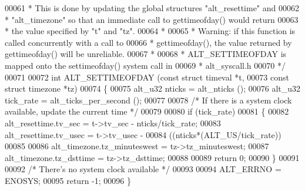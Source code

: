 \begin{DoxyCode}
00061 \textcolor{comment}{ * This is done by updating the global structures "alt\_resettime" and }
00062 \textcolor{comment}{ * "alt\_timezone" so that an immediate call to gettimeofday() would return}
00063 \textcolor{comment}{ * the value specified by "t" and "tz". }
00064 \textcolor{comment}{ *}
00065 \textcolor{comment}{ * Warning: if this function is called concurrently with a call to }
00066 \textcolor{comment}{ * gettimeofday(), the value returned by gettimeofday() will be unreliable.  }
00067 \textcolor{comment}{ *}
00068 \textcolor{comment}{ * ALT\_SETTIMEOFDAY is mapped onto the settimeofday() system call in }
00069 \textcolor{comment}{ * alt\_syscall.h}
00070 \textcolor{comment}{ */}
00071  
00072 \textcolor{keywordtype}{int} ALT_SETTIMEOFDAY (\textcolor{keyword}{const} \textcolor{keyword}{struct} timeval  *t,
00073                       \textcolor{keyword}{const} \textcolor{keyword}{struct} timezone *tz)
00074 \{
00075   alt_u32 nticks    = alt_nticks ();
00076   alt_u32 tick\_rate = alt_ticks_per_second ();
00077 
00078   \textcolor{comment}{/* If there is a system clock available, update the current time */}
00079 
00080   \textcolor{keywordflow}{if} (tick\_rate)
00081   \{
00082     alt_resettime.tv\_sec  = t->tv\_sec - nticks/tick\_rate;
00083     alt_resettime.tv\_usec = t->tv\_usec - 
00084       ((nticks*(ALT_US/tick\_rate))%
00085 
00086     alt_timezone.tz\_minuteswest = tz->tz\_minuteswest;
00087     alt_timezone.tz\_dsttime     = tz->tz\_dsttime;
00088     
00089     \textcolor{keywordflow}{return} 0;
00090   \}
00091   
00092   \textcolor{comment}{/* There's no system clock available */}
00093 
00094   ALT_ERRNO = ENOSYS;
00095   \textcolor{keywordflow}{return} -1;
00096 \}
\end{DoxyCode}
